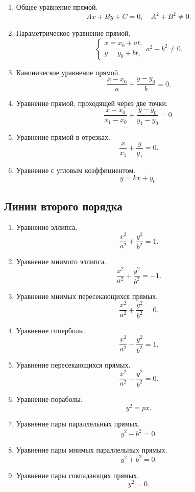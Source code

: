 \documentclass[12pt]{report}
\theoremstyle{definition}
\begin{document}
\begin{enumerate}
\item Общее уравнение прямой.
  $$
    Ax + By + C = 0, \quad A^2 + B^2 \ne 0.
  $$
\item Параметрическое уравнение прямой.
  $$
  \begin{cases}
    x=x_0+at, \\
    y=y_0+bt,
  \end{cases}
  a^2 + b^2 \ne 0.
  $$
\item Каноническое уравнение прямой.
  $$
    \dfrac{x - x_0}{a} + \dfrac{y - y_0}{b} = 0.
  $$
\item Уравнение прямой, проходящей через две точки.
  $$
    \dfrac{x - x_0}{x_1 - x_0} + \dfrac{y - y_0}{y_1 - y_0} = 0.
  $$
\item Уравнение прямой в отрезках.
  $$
    \dfrac{x}{x_1} + \dfrac{y}{y_1} = 0.
  $$
\item Уравнение с угловым коэффициентом.
  $$
    y = kx + y_0.
  $$
\end{enumerate}

\subsection{Линии второго порядка}

\begin{enumerate}
\item Уравнение эллипса.
  $$
    \dfrac{x^2}{a^2} + \dfrac{y^2}{b^2} = 1.
  $$
\item Уравнение мнимого эллипса.
  $$
    \dfrac{x^2}{a^2} + \dfrac{y^2}{b^2} = -1.
  $$
\item Уравнение мнимых пересекающихся прямых.
  $$
    \dfrac{x^2}{a^2} + \dfrac{y^2}{b^2} = 0.
  $$
\item Уравнение гиперболы.
  $$
    \dfrac{x^2}{a^2} - \dfrac{y^2}{b^2} = 1.
  $$
\item Уравнение пересекающихся прямых.
  $$
    \dfrac{x^2}{a^2} - \dfrac{y^2}{b^2} = 0.
  $$
\item Уравнение пораболы.
  $$
    y^2 = px.
  $$
\item Уравнение пары параллельных прямых.
  $$
    y^2 - b^2 = 0.
  $$
\item Уравнение пары мнимых параллельных прямых.
  $$
    y^2 + b^2 = 0.
  $$
\item Уравнение пары совпадающих прямых.
  $$
    y^2 = 0.
  $$
\end{enumerate}

\end{document}
